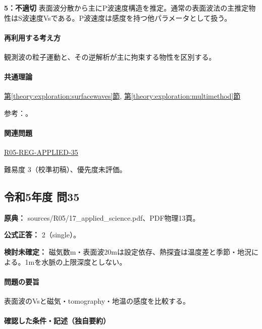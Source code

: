 \noindent\textbf{5：不適切} 表面波分散から主にP波速度構造を推定。通常の表面波法の主推定物性はS波速度Vsである。P波速度は感度を持つ他パラメータとして扱う。\par

\paragraph{再利用する考え方} 観測波の粒子運動と、その逆解析が主に拘束する物性を区別する。

\paragraph{共通理論} \hyperref[theory:exploration:surfacewaves]{第\ref*{theory:exploration:surfacewaves}節}, \hyperref[theory:exploration:multimethod]{第\ref*{theory:exploration:multimethod}節}

\par 参考：\cite{epa_surfacewaves,epa_gpr,rion_vibration2016,gsi_gravity_definitions}。

\paragraph{関連問題} \hyperref[q:r05-reg-applied-35]{R05-REG-APPLIED-35}

\par 難易度 3（校準初稿）、優先度未評価。

\subsection{令和5年度 問35}
\label{q:r05-reg-applied-35}

\noindent\textbf{原典：} sources/R05/17\_applied\_science.pdf、PDF物理13頁。

\textbf{公式正答：} 2（single）。

\par\textbf{検討未確定：} 磁気数m・表面波20mは設定依存、熱探査は温度差と季節・地況による。1mを水脈の上限深度としない。

\paragraph{問題の要旨} 表面波のVsと磁気・tomography・地温の感度を比較する。

\paragraph{確認した条件・記述（独自要約）}\mbox{}\par

